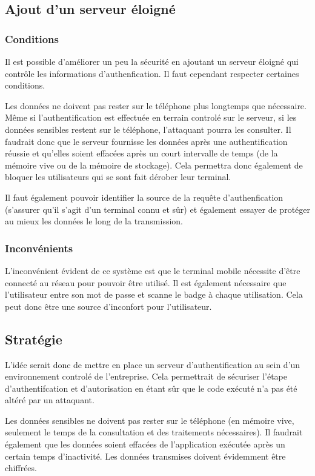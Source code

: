 \documentclass[francais,12pt]{article}
\begin{document}
	 \subsection*{Ajout d'un serveur éloigné}
	 \subsubsection*{Conditions}
	 Il est possible d'améliorer un peu la sécurité en ajoutant un serveur éloigné qui contrôle les informations d'authenfication. Il faut cependant respecter certaines conditions. 
	 
	 Les données ne doivent pas rester sur le téléphone plus longtemps que nécessaire. Même si l'authentification est effectuée en terrain controlé sur le serveur, si les données sensibles restent sur le téléphone, l'attaquant pourra les consulter. Il faudrait donc que le serveur fournisse les données après une authentification réussie et qu'elles soient effacées après un court intervalle de temps (de la mémoire vive ou de la mémoire de stockage). Cela permettra donc également de bloquer les utilisateurs qui se sont fait dérober leur terminal. 
	 
	 Il faut également pouvoir identifier la source de la requête d'authenfication (s'assurer qu'il s'agit d'un terminal connu et sûr) et également essayer de protéger au mieux les données le long de la transmission.  
	 
	 \subsubsection*{Inconvénients}
	 L'inconvénient évident de ce système est que le terminal mobile nécessite d'être connecté au réseau pour pouvoir être utilisé. Il est également nécessaire que l'utilisateur entre son mot de passe et scanne le badge à chaque utilisation. Cela peut donc être une source d'inconfort pour l'utilisateur. 
	 
	 \subsection*{Stratégie}
	 L'idée serait donc de mettre en place un serveur d'authentification au sein d'un environnement controlé de l'entreprise. Cela permettrait de sécuriser l'étape d'authentifcation et d'autorisation en étant sûr que le code exécuté n'a pas été altéré par un attaquant. 
	 
	 Les données sensibles ne doivent pas rester sur le téléphone (en mémoire vive, seulement le temps de la consultation et des traitements nécessaires). Il faudrait également que les données soient effacées de l'application exécutée après un certain temps d'inactivité. Les données transmises doivent évidemment être chiffrées.
	 
\end{document}
